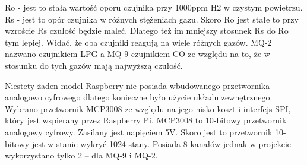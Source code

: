 Ro - jest to stała wartość oporu czujnika przy 1000ppm H2 w czystym powietrzu.\\
Rs - jest to opór czujnika w różnych stężeniach gazu.
Skoro Ro jest stałe to przy wzroście Rs czułość będzie maleć. Dlatego też im mniejszy stosunek Rs do Ro tym lepiej. Widać, że oba czujniki reagują na wiele różnych gazów. MQ-2 nazwano czujnikiem LPG a MQ-9 czujnikiem CO ze względu na to, że w stosunku do tych gazów mają najwyższą czułość. 

Niestety żaden model Raspberry nie posiada wbudowanego przetwornika analogowo cyfrowego dlatego konieczne było użycie układu zewnętrznego. Wybrano przetwornik MCP3008 ze względu na jego nisko koszt i interfejs SPI, który jest wspierany przez Raspberry Pi. MCP3008 to 10-bitowy przetwornik analogowy cyfrowy. Zasilany jest napięciem 5V.  Skoro jest to przetwornik 10-bitowy jest w stanie wykryć 1024 stany. Posiada 8 kanałów jednak w projekcie wykorzystano tylko 2 – dla MQ-9 i MQ-2.
